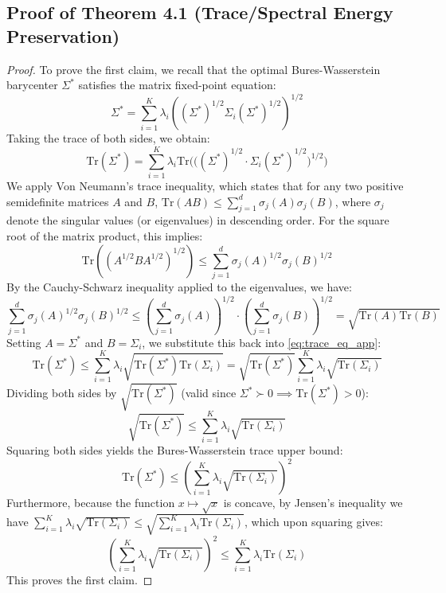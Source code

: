 \documentclass{article}
\theoremstyle{plain}
\theoremstyle{definition}
\theoremstyle{remark}
\begin{document}
\subsection{Proof of Theorem 4.1 (Trace/Spectral Energy Preservation)}
\label{appendix:proof-trace}
\begin{proof}
To prove the first claim, we recall that the optimal Bures-Wasserstein barycenter $\Sigma^*$ satisfies the matrix fixed-point equation:
\begin{equation}
  \Sigma^* = \sum_{i=1}^K \lambda_i \left( (\Sigma^*)^{1/2} \Sigma_i (\Sigma^*)^{1/2} \right)^{1/2}
\end{equation}
Taking the trace of both sides, we obtain:
\begin{equation}
  \label{eq:trace_eq_app}
  \text{Tr}(\Sigma^*) = \sum_{i=1}^K \lambda_i \text{Tr}\Big( \big( (\Sigma^*)^{1/2} \cdot \Sigma_i (\Sigma^*)^{1/2} \big)^{1/2} \Big)
\end{equation}
We apply Von Neumann's trace inequality, which states that for any two positive semidefinite matrices $A$ and $B$, $\text{Tr}(AB) \leq \sum_{j=1}^d \sigma_j(A) \sigma_j(B)$, where $\sigma_j$ denote the singular values (or eigenvalues) in descending order. For the square root of the matrix product, this implies:
\begin{equation}
  \text{Tr}\left( (A^{1/2} B A^{1/2})^{1/2} \right) \leq \sum_{j=1}^d \sigma_j(A)^{1/2} \sigma_j(B)^{1/2}
\end{equation}
By the Cauchy-Schwarz inequality applied to the eigenvalues, we have:
\begin{equation}
  \sum_{j=1}^d \sigma_j(A)^{1/2} \sigma_j(B)^{1/2} \leq \left( \sum_{j=1}^d \sigma_j(A) \right)^{1/2} \cdot \left( \sum_{j=1}^d \sigma_j(B) \right)^{1/2} = \sqrt{\text{Tr}(A) \text{Tr}(B)}
\end{equation}
Setting $A = \Sigma^*$ and $B = \Sigma_i$, we substitute this back into \eqref{eq:trace_eq_app}:
\begin{equation}
  \text{Tr}(\Sigma^*) \leq \sum_{i=1}^K \lambda_i \sqrt{\text{Tr}(\Sigma^*)\text{Tr}(\Sigma_i)} = \sqrt{\text{Tr}(\Sigma^*)} \sum_{i=1}^K \lambda_i \sqrt{\text{Tr}(\Sigma_i)}
\end{equation}
Dividing both sides by $\sqrt{\text{Tr}(\Sigma^*)}$ (valid since $\Sigma^* \succ 0 \implies \text{Tr}(\Sigma^*) > 0$):
\begin{equation}
  \sqrt{\text{Tr}(\Sigma^*)} \leq \sum_{i=1}^K \lambda_i \sqrt{\text{Tr}(\Sigma_i)}
\end{equation}
Squaring both sides yields the Bures-Wasserstein trace upper bound:
\begin{equation}
  \text{Tr}(\Sigma^*) \leq \left( \sum_{i=1}^K \lambda_i \sqrt{\text{Tr}(\Sigma_i)} \right)^2
\end{equation}
Furthermore, because the function $x \mapsto \sqrt{x}$ is concave, by Jensen's inequality we have $\sum_{i=1}^K \lambda_i \sqrt{\text{Tr}(\Sigma_i)} \leq \sqrt{\sum_{i=1}^K \lambda_i \text{Tr}(\Sigma_i)}$, which upon squaring gives:
\begin{equation}
  \left( \sum_{i=1}^K \lambda_i \sqrt{\text{Tr}(\Sigma_i)} \right)^2 \leq \sum_{i=1}^K \lambda_i \text{Tr}(\Sigma_i)
\end{equation}
This proves the first claim.


\end{proof}
\end{document}
